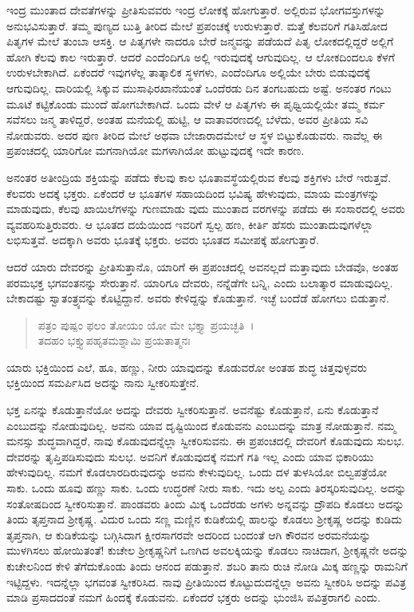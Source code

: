 ಇಂದ್ರ ಮುಂತಾದ ದೇವತೆಗಳನ್ನು ಪ್ರೀತಿಸುವವರು ಇಂದ್ರ ಲೋಕಕ್ಕೆ ಹೋಗುತ್ತಾರೆ. ಅಲ್ಲಿರುವ ಭೋಗವಸ್ತುಗಳನ್ನು ಅನುಭವಿಸುತ್ತಾರೆ. ತಮ್ಮ ಪುಣ್ಯದ ಬುತ್ತಿ ತೀರಿದ ಮೇಲೆ ಪ್ರಪಂಚಕ್ಕೆ ಉರುಳುತ್ತಾರೆ. ಮತ್ತೆ ಕೆಲವರಿಗೆ ಗತಿಸಿಹೋದ ಪಿತೃಗಳ ಮೇಲೆ ತುಂಬಾ ಆಸಕ್ತಿ. ಆ ಪಿತೃಗಳೇ ನಾದರೂ ಬೇರೆ ಜನ್ಮವನ್ನು ಪಡೆಯದೆ ಪಿತೃ ಲೋಕದಲ್ಲಿದ್ದರೆ ಅಲ್ಲಿಗೆ ಹೋಗಿ ಕೆಲವು ಕಾಲ ಇರುತ್ತಾರೆ. ಆದರೆ ಎಂದೆಂದಿಗೂ ಅಲ್ಲಿ ಇರುವುದಕ್ಕೆ ಆಗುವುದಿಲ್ಲ. ಆ ಲೋಕದಿಂದಲೂ ಕೆಳಗೆ ಉರುಳಬೇಕಾಗಿದೆ. ಏಕೆಂದರೆ ಇವುಗಳೆಲ್ಲ ತಾತ್ಕಾಲಿಕ ಸ್ಥಳಗಳು, ಎಂದೆಂದಿಗೂ ಅಲ್ಲಿಯೇ ಬೇರು ಬಿಡುವುದಕ್ಕೆ ಆಗುವುದಿಲ್ಲ. ದಾರಿಯಲ್ಲಿ ಸಿಕ್ಕುವ ಮುಸಾಫಿರಖಾನೆಯಂತೆ ಒಂದೆರಡು ದಿನ ತಂಗಬಹುದು ಅಷ್ಟೆ. ಅನಂತರ ಗಂಟು ಮೂಟೆ ಕಟ್ಟಿಕೊಂಡು ಮುಂದೆ ಹೋಗಬೇಕಾಗಿದೆ. ಒಂದು ವೇಳೆ ಆ ಪಿತೃಗಳು ಈ ಪೃಥ್ವಿಯಲ್ಲಿಯೇ ತಮ್ಮ ಕರ್ಮ ಸವೆಸಲು ಜನ್ಮ ತಾಳಿದ್ದರೆ, ಅಂತಹ ಮನೆಯಲ್ಲಿ ಹುಟ್ಟಿ, ಆ ವಾತಾವರಣದಲ್ಲಿ ಬೆಳೆದು, ಅವರ ಪ್ರೀತಿಯ ಸವಿ ನೋಡುವರು. ಅದರ ಪುಣ ತೀರಿದ ಮೇಲೆ ಅಥವಾ ಬೇಜಾರಾದಮೇಲೆ ಆ ಸ್ಥಳ ಬಿಟ್ಟುಕೊಡುವರು. ನಾವೆಲ್ಲ ಈ ಪ್ರಪಂಚದಲ್ಲಿ ಯಾರಿಗೋ ಮಗನಾಗಿಯೋ ಮಗಳಾಗಿಯೋ ಹುಟ್ಟುವುದಕ್ಕೆ ಇದೇ ಕಾರಣ.

ಅನಂತರ ಅತೀಂದ್ರಿಯ ಶಕ್ತಿಯನ್ನು ಪಡೆದು ಕೆಲವು ಕಾಲ ಭೂತಾವಸ್ಥೆಯಲ್ಲಿರುವ ಕೆಲವು ಶಕ್ತಿಗಳು ಬೇರೆ ಇರುತ್ತವೆ. ಕೆಲವರು ಅದಕ್ಕೆ ಭಕ್ತರು. ಏಕೆಂದರೆ ಆ ಭೂತಗಳ ಸಹಾಯದಿಂದ ಭವಿಷ್ಯ ಹೇಳುವುದು, ಮಾಯ ಮಂತ್ರಗಳನ್ನು ಮಾಡುವುದು, ಕೆಲವು ಖಾಯಿಲೆಗಳನ್ನು ಗುಣಮಾಡು ವುದು ಮುಂತಾದ ವರಗಳನ್ನು ಪಡೆದು ಈ ಸಂಸಾರದಲ್ಲಿ ಅವರು ವ್ಯವಹರಿಸುತ್ತಿರುವರು. ಆ ಭೂತದ ದಯೆಯಿಂದ ಇವರಿಗೆ ಸ್ವಲ್ಪ ಹಣ, ಕೀರ್ತಿ ಹೆಸರು ಮುಂತಾದುವುಗಳೆಲ್ಲಾ ಲಭಿಸುತ್ತವೆ. ಅದಕ್ಕಾಗಿ ಅವರು ಭೂತಕ್ಕೆ ಭಕ್ತರು. ಅವರು ಭೂತದ ಸಮೀಪಕ್ಕೆ ಹೋಗುತ್ತಾರೆ.

ಆದರೆ ಯಾರು ದೇವರನ್ನು ಪ್ರೀತಿಸುತ್ತಾನೊ, ಯಾರಿಗೆ ಈ ಪ್ರಪಂಚದಲ್ಲಿ ಅವನಲ್ಲದೆ ಮತ್ತಾವುದು ಬೇಡವೊ, ಅಂತಹ ಪರಮಭಕ್ತ ಭಗವಂತನನ್ನು ಸೇರುತ್ತಾನೆ. ಯಾರಿಗೂ ದೇವರು, ನನ್ನೆಡೆಗೇ ಬನ್ನಿ, ಎಂದು ಬಲಾತ್ಕಾರ ಮಾಡುವುದಿಲ್ಲ. ಬೇಕಾದಷ್ಟು ಸ್ವಾತಂತ್ರ್ಯವನ್ನು ಕೊಟ್ಟಿದ್ದಾನೆ. ಅವರು ಕೇಳಿದ್ದನ್ನು ಕೊಡುತ್ತಾನೆ. ಇಚ್ಛೆ ಬಂದೆಡೆ ಹೋಗಲು ಬಿಡುತ್ತಾನೆ.

\begin{verse}
ಪತ್ರಂ ಪುಷ್ಪಂ ಫಲಂ ತೋಯಂ ಯೋ ಮೇ ಭಕ್ತ್ಯಾ ಪ್ರಯಚ್ಛತಿ~।\\ತದಹಂ ಭಕ್ತ್ಯುಪಹೃತಮಶ್ನಾಮಿ ಪ್ರಯತಾತ್ಮನಃ 
\end{verse}

{\small ಯಾರು ಭಕ್ತಿಯಿಂದ ಎಲೆ, ಹೂ, ಹಣ್ಣು, ನೀರು ಯಾವುದನ್ನು ಕೊಡುವರೋ ಅಂತಹ ಶುದ್ಧ ಚಿತ್ತವುಳ್ಳವರು ಭಕ್ತಿಯಿಂದ ಸಮರ್ಪಿಸಿದ ಅದನ್ನು ನಾನು ಸ್ವೀಕರಿಸುತ್ತೇನೆ.}

ಭಕ್ತ ಏನನ್ನು ಕೊಡುತ್ತಾನೆಯೋ ಅದನ್ನು ದೇವರು ಸ್ವೀಕರಿಸುತ್ತಾನೆ. ಅವನೆಷ್ಟು ಕೊಡುತ್ತಾನೆ, ಏನು ಕೊಡುತ್ತಾನೆ ಎಂಬುದನ್ನು ನೋಡುವುದಿಲ್ಲ. ಅವನು ಯಾವ ದೃಷ್ಟಿಯಿಂದ ಕೊಡುವನು ಎಂಬುದನ್ನು ಮಾತ್ರ ನೋಡುತ್ತಾನೆ. ನಮ್ಮ ಮನಸ್ಸು ಶುದ್ಧವಾಗಿದ್ದರೆ, ನಾವು ಕೊಡುವುದನ್ನೆಲ್ಲಾ ಸ್ವೀಕರಿಸುವನು. ಈ ಪ್ರಪಂಚದಲ್ಲಿ ದೇವರಿಗೆ ಕೊಡುವುದು ಸುಲಭ. ದೇವರನ್ನು ತೃಪ್ತಿಪಡಿಸುವುದು ಸುಲಭ. ಅವನಿಗೆ ಕೊಡುವುದಕ್ಕೆ ನಮಗೆ ಗತಿ ಇಲ್ಲ ಎಂದು ಯಾವ ಭಿಕಾರಿಯು ಹೇಳುವುದಿಲ್ಲ. ನಮಗೆ ಕೊಡಲಾರದಿರುವುದನ್ನು ಅವನು ಕೇಳುವುದಿಲ್ಲ. ಒಂದು ದಳ ತುಳಸಿಯೋ ಬಿಲ್ವಪತ್ರೆಯೋ ಸಾಕು. ಒಂದು ಹೂವು ಹಣ್ಣು ಸಾಕು. ಒಂದು ಉದ್ಧರಣೆ ನೀರು ಸಾಕು. ಇದು ಅಲ್ಪ ಎಂದು ತಿರಸ್ಕರಿಸುವುದಿಲ್ಲ. ಅದನ್ನು ಸಂತೋಷದಿಂದ ಸ್ವೀಕರಿಸುತ್ತಾನೆ. ಪಾಂಡವರು ತಿಂದು ಮಿಕ್ಕ ಒಂದೆರಡು ಅಗಳು ಅನ್ನವನ್ನು ದ್ರೌಪದಿ ಕೊಡಲು ಅದನ್ನು ತಿಂದು ತೃಪ್ತನಾದ ಶ‍್ರೀಕೃಷ್ಣ. ವಿದುರ ಒಂದು ಸಣ್ಣ ಮಣ್ಣಿನ ಕುಡಿಕೆಯಲ್ಲಿ ಹಾಲನ್ನು ಕೊಡಲು ಶ‍್ರೀಕೃಷ್ಣ ಅದನ್ನು ಕುಡಿದು ತೃಪ್ತನಾಗಿ, ಆ ಕುಡಿಕೆಯನ್ನು ಬಗ್ಗಿಸಿದಾಗ ಕ್ಷೀರಸಾಗರವೇ ಅದರಿಂದ ಬಂದಂತೆ ಆಗಿ ಕೌರವನ ಅರಮನೆಯನ್ನು ಮುಳಗಿಸಲು ಹೋಯಿತಂತೆ! ಕುಚೇಲ ಶ‍್ರೀಕೃಷ್ಣನಿಗೆ ಒಣಗಿದ ಅವಲಕ್ಕಿಯನ್ನು ಕೊಡಲು ನಾಚಿದಾಗ, ಶ‍್ರೀಕೃಷ್ಣನೇ ಅದನ್ನು ಕುಚೇಲನಿಂದ ಕೇಳಿ ತೆಗೆದುಕೊಂಡು ತಿಂದು ಆನಂದ ಪಡುತ್ತಾನೆ. ಶಬರಿ ತಾನು ರುಚಿ ನೋಡಿ ಮಿಕ್ಕ ಹಣ್ಣನ್ನು ರಾಮನಿಗೆ ಇಟ್ಟಿದ್ದಳು. ಇದನ್ನೆಲ್ಲಾ ಭಗವಂತ ಸ್ವೀಕರಿಸಿದ. ನಾವು ಪ್ರೀತಿಯಿಂದ ಕೊಟ್ಟುದುದನ್ನೆಲ್ಲಾ ಅವನು ಸ್ವೀಕರಿಸಿ ಅದನ್ನು ಪವಿತ್ರ ಮಾಡಿ ಪ್ರಸಾದದಂತೆ ನಮಗೆ ಹಿಂದಕ್ಕೆ ಕೊಡುವನು. ಏಕೆಂದರೆ ಭಕ್ತರು ಅದನ್ನು ಭುಂಜಿಸಿ ಪವಿತ್ರರಾಗಲಿ ಎಂದು.

